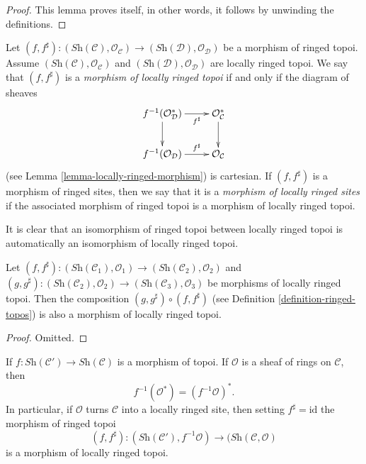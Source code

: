 \begin{proof}
This lemma proves itself, in other words, it follows by unwinding the
definitions.
\end{proof}

\begin{definition}
\label{definition-morphism-locally-ringed-topoi}
Let $(f, f^\sharp) : (\textit{Sh}(\mathcal{C}), \mathcal{O}_{\mathcal{C}})
\to (\textit{Sh}(\mathcal{D}), \mathcal{O}_{\mathcal{D}})$
be a morphism of ringed topoi. Assume
$(\textit{Sh}(\mathcal{C}), \mathcal{O}_{\mathcal{C}})$
and
$(\textit{Sh}(\mathcal{D}), \mathcal{O}_{\mathcal{D}})$
are locally ringed topoi. We say that $(f, f^\sharp)$ is a
{\it morphism of locally ringed topoi} if and only if the
diagram of sheaves
$$
\xymatrix{
f^{-1}(\mathcal{O}^*_{\mathcal{D}}) \ar[r]_-{f^\sharp} \ar[d] &
\mathcal{O}^*_{\mathcal{C}} \ar[d] \\
f^{-1}(\mathcal{O}_{\mathcal{D}}) \ar[r]^-{f^\sharp} &
\mathcal{O}_{\mathcal{C}}
}
$$
(see
Lemma \ref{lemma-locally-ringed-morphism})
is cartesian. If $(f, f^\sharp)$ is a morphism of ringed sites, then
we say that it is a {\it morphism of locally ringed sites} if
the associated morphism of ringed topoi is a morphism of locally ringed
topoi.
\end{definition}

\noindent
It is clear that an isomorphism of ringed topoi between locally ringed
topoi is automatically an isomorphism of locally ringed topoi.

\begin{lemma}
\label{lemma-composition-morphisms-locally-ringed-topoi}
Let
$(f, f^\sharp) :
(\textit{Sh}(\mathcal{C}_1), \mathcal{O}_1)
\to (\textit{Sh}(\mathcal{C}_2), \mathcal{O}_2)$ and
$(g, g^\sharp) :
(\textit{Sh}(\mathcal{C}_2), \mathcal{O}_2) \to
(\textit{Sh}(\mathcal{C}_3), \mathcal{O}_3)$
be morphisms of locally ringed topoi. Then the composition
$(g, g^\sharp) \circ (f, f^\sharp)$ (see
Definition \ref{definition-ringed-topos})
is also a morphism of locally ringed topoi.
\end{lemma}

\begin{proof}
Omitted.
\end{proof}

\begin{lemma}
\label{lemma-locally-ringed-intrinsic-morphism}
If $f : \textit{Sh}(\mathcal{C}') \to \textit{Sh}(\mathcal{C})$
is a morphism of topoi. If $\mathcal{O}$ is a sheaf of rings
on $\mathcal{C}$, then
$$
f^{-1}(\mathcal{O}^*) = (f^{-1}\mathcal{O})^*.
$$
In particular, if $\mathcal{O}$ turns $\mathcal{C}$ into a locally
ringed site, then setting $f^\sharp = \text{id}$
the morphism of ringed topoi
$$
(f, f^\sharp) :
(\textit{Sh}(\mathcal{C}'), f^{-1}\mathcal{O})
\to
(\textit{Sh}(\mathcal{C}, \mathcal{O})
$$
is a morphism of locally ringed topoi.
\end{lemma}

